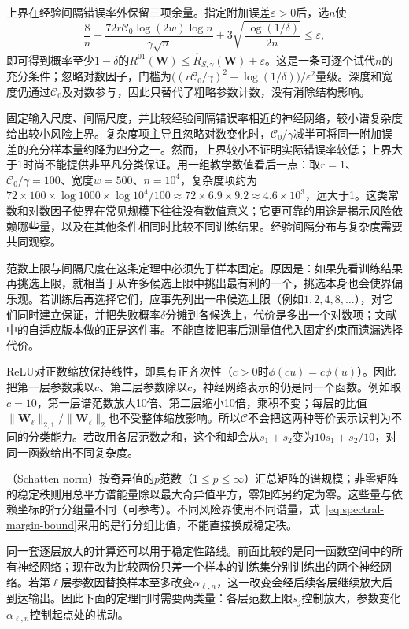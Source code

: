 上界在经验间隔错误率外保留三项余量。指定附加误差$\varepsilon>0$后，选$n$使
\[
 \frac8n+\frac{72r\mathcal C_0\log(2w)\log n}{\gamma\sqrt n}
 +3\sqrt{\frac{\log(1/\delta)}{2n}}\leq\varepsilon,
\]
即可得到概率至少$1-\delta$的$R^{01}(\bm W)\leq\hat R_{S,\gamma}(\bm W)+\varepsilon$。这是一条可逐个试代$n$的充分条件；忽略对数因子，门槛为$\bigl((r\mathcal C_0/\gamma)^2+\log(1/\delta)\bigr)/\varepsilon^2$量级。深度和宽度仍通过$\mathcal C_0$及对数参与，因此只替代了粗略参数计数，没有消除结构影响。

固定输入尺度、间隔尺度，并比较经验间隔错误率相近的神经网络，较小谱复杂度给出较小风险上界。复杂度项主导且忽略对数变化时，$\mathcal C_0/\gamma$减半可将同一附加误差的充分样本量约降为四分之一。然而，上界较小不证明实际错误率较低；上界大于1时尚不能提供非平凡分类保证。用一组教学数值看后一点：取$r=1$、$\mathcal C_0/\gamma=100$、宽度$w=500$、$n=10^4$，复杂度项约为$72\times100\times\log1000\times\log10^4/100\approx72\times6.9\times9.2\approx4.6\times10^3$，远大于1。这类常数和对数因子使界在常见规模下往往没有数值意义；它更可靠的用途是揭示风险依赖哪些量，以及在其他条件相同时比较不同训练结果。经验间隔分布与复杂度需要共同观察。

范数上限与间隔尺度在这条定理中必须先于样本固定。原因是：如果先看训练结果再挑选上限，就相当于从许多候选上限中挑出最有利的一个，挑选本身也会使界偏乐观。若训练后再选择它们，应事先列出一串候选上限（例如$1,2,4,8,\ldots$），对它们同时建立保证，并把失败概率$\delta$分摊到各候选上，代价是多出一个对数项；文献中的自适应版本做的正是这件事。不能直接把事后测量值代入固定约束而遗漏选择代价。

ReLU对正数缩放保持线性，即具有正齐次性（$c>0$时$\phi(cu)=c\phi(u)$）。因此把第一层参数乘以$c$、第二层参数除以$c$，神经网络表示的仍是同一个函数。例如取$c=10$，第一层谱范数放大10倍、第二层缩小10倍，乘积不变；每层的比值$\|\bm W_\ell\|_{2,1}/\|\bm W_\ell\|_2$也不受整体缩放影响。所以$\mathcal C$不会把这两种等价表示误判为不同的分类能力。若改用各层范数之和，这个和却会从$s_1+s_2$变为$10s_1+s_2/10$，对同一函数给出不同复杂度。

（Schatten norm）按奇异值的$p$范数（$1\leq p\leq\infty$）汇总矩阵的谱规模；非零矩阵的稳定秩则用总平方谱能量除以最大奇异值平方，零矩阵另约定为零。这些量与依赖坐标的行分组量不同（可参考）。不同风险界使用不同谱量，式~\eqref{eq:spectral-margin-bound}采用的是行分组比值，不能直接换成稳定秩。

同一套逐层放大的计算还可以用于稳定性路线。前面比较的是同一函数空间中的所有神经网络；现在改为比较两份只差一个样本的训练集分别训练出的两个神经网络。若第$\ell$层参数因替换样本至多改变$\alpha_{\ell,n}$，这一改变会经后续各层继续放大后到达输出。因此下面的定理同时需要两类量：各层范数上限$s_j$控制放大，参数变化$\alpha_{\ell,n}$控制起点处的扰动。

